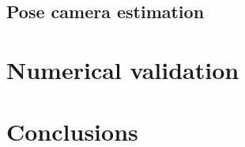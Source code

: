 \subsection{Pose camera estimation}

\section{Numerical validation}

\section{Conclusions}



%
%
%
%
%
%
%
